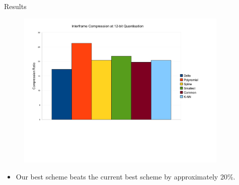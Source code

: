 \documentclass{beamer}
\begin{document}
\begin{frame}{Results}
\begin{figure}[h]
\centering \includegraphics[trim = 10mm 60mm 10mm 5mm, clip,
  width=0.9\textwidth]{julian-images/interframe_results.png}
\end{figure}
\begin{itemize}
\item Our best scheme beats the current best scheme by approximately 20\%.
\end{itemize}
\end{frame}
\end{document}
